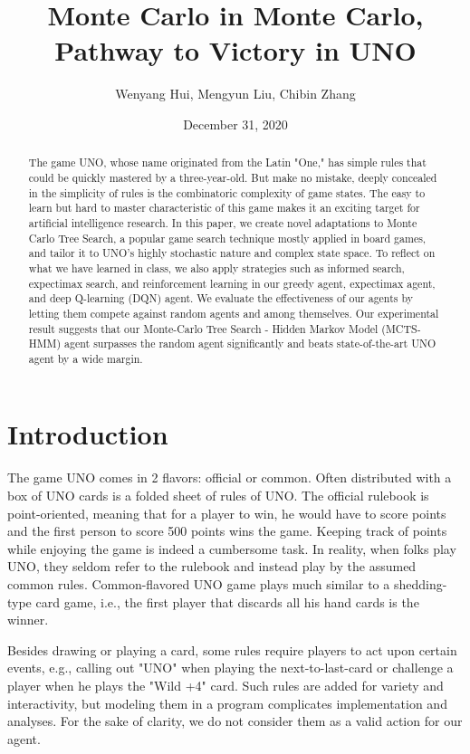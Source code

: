 \documentclass{article}
\title{Monte Carlo in Monte Carlo, Pathway to Victory in UNO}
\author{Wenyang Hui, Mengyun Liu, Chibin Zhang}
\date{December 31, 2020}
\begin{document}
\maketitle

\newcommand{\todo}[1]{\textbf{\color{red}{todo[#1]}}}

\begin{abstract}

The game UNO, whose name originated from the Latin "One," has simple rules that could be quickly mastered by a three-year-old. But make no mistake, deeply concealed in the simplicity of rules is the combinatoric complexity of game states. The easy to learn but hard to master characteristic of this game makes it an exciting target for artificial intelligence research. In this paper, we create novel adaptations to Monte Carlo Tree Search, a popular game search technique mostly applied in board games, and tailor it to UNO's highly stochastic nature and complex state space. To reflect on what we have learned in class, we also apply strategies such as informed search, expectimax search, and reinforcement learning in our greedy agent, expectimax agent, and deep Q-learning (DQN) agent. We evaluate the effectiveness of our agents by letting them compete against random agents and among themselves. Our experimental result suggests that our Monte-Carlo Tree Search - Hidden Markov Model (MCTS-HMM) agent surpasses the random agent significantly and beats state-of-the-art UNO agent\cite{olivia2020winning} by a wide margin.

\end{abstract}

\section{Introduction}
The game UNO comes in 2 flavors: official or common. Often distributed with a box of UNO cards is a folded sheet of rules of UNO\cite{mattel}. The official rulebook is point-oriented, meaning that for a player to win, he would have to score points and the first person to score 500 points wins the game. Keeping track of points while enjoying the game is indeed a cumbersome task. In reality, when folks play UNO, they seldom refer to the rulebook and instead play by the assumed common rules\cite{wiki:uno}. Common-flavored UNO game plays much similar to a shedding-type card game, i.e., the first player that discards all his hand cards is the winner.

Besides drawing or playing a card, some rules require players to act upon certain events, e.g., calling out "UNO" when playing the next-to-last-card or challenge a player when he plays the "Wild +4" card. Such rules are added for variety and interactivity, but modeling them in a program complicates implementation and analyses. For the sake of clarity, we do not consider them as a valid action for our agent. 
\end{document}
